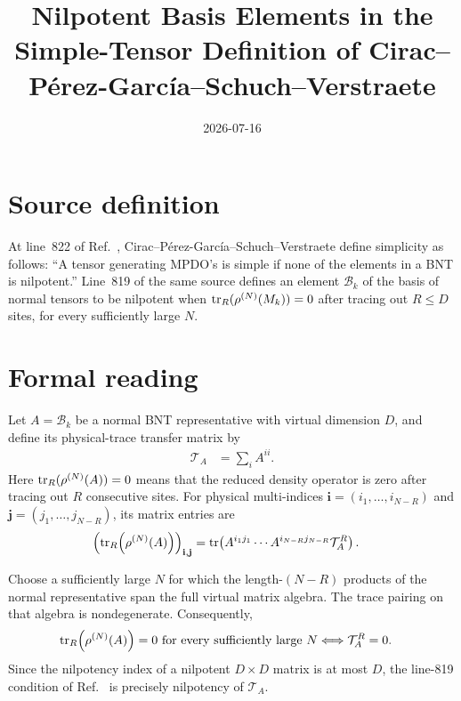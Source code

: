\documentclass{article}
\title{Nilpotent Basis Elements in the Simple-Tensor Definition of
Cirac--P\'erez-Garc\'ia--Schuch--Verstraete}
\author{}
\date{2026-07-16}
\begin{document}
\maketitle
{}

\section{Source definition}

At line~822 of Ref.~\cite{Cirac2016MPDO_arXiv},
Cirac--P\'erez-Garc\'ia--Schuch--Verstraete define simplicity as follows:
``A tensor generating MPDO's is simple if none of the elements in a BNT is
nilpotent.'' Line~819 of the same source defines an element
$\mathcal B_k$ of the basis of normal tensors to be nilpotent when
$\operatorname{tr}_R(\rho^{(N)}(M_k))=0$ after tracing out $R\leq D$ sites, for every
sufficiently large $N$.

\section{Formal reading}

Let $A=\mathcal B_k$ be a normal BNT representative with virtual dimension
$D$, and define its physical-trace transfer matrix by
\begin{align}
    \mathcal T_A
        &= \sum_i A^{ii}.
    \label{eq:cpsvnil_physical_trace_transfer}
\end{align}
Here $\operatorname{tr}_R(\rho^{(N)}(A))=0$ means that the reduced density operator is zero
after tracing out $R$ consecutive sites. For physical multi-indices
$\mathbf i=(i_1,\ldots,i_{N-R})$ and
$\mathbf j=(j_1,\ldots,j_{N-R})$, its matrix entries are
\begin{align}
    \left(\operatorname{tr}_R\!\left(\rho^{(N)}(A)\right)\right)_{\mathbf i,\mathbf j}
        &=
        \operatorname{tr}\!\left(A^{i_1j_1}\cdots A^{i_{N-R}j_{N-R}}\mathcal T_A^R\right).
    \label{eq:cpsvnil_reduced_operator_entry}
\end{align}

Choose a sufficiently large $N$ for which the length-$(N-R)$ products of the
normal representative span the full virtual matrix algebra. The trace pairing
on that algebra is nondegenerate. Consequently,
\begin{align}
    \operatorname{tr}_R\!\left(\rho^{(N)}(A)\right)=0
    \text{ for every sufficiently large }N
        &\Longleftrightarrow
        \mathcal T_A^R=0.
    \label{eq:cpsvnil_partial_trace_transfer_equivalence}
\end{align}
Since the nilpotency index of a nilpotent $D\times D$ matrix is at most $D$,
the line-819 condition of Ref.~\cite{Cirac2016MPDO_arXiv} is precisely
nilpotency of $\mathcal T_A$.
\end{document}
